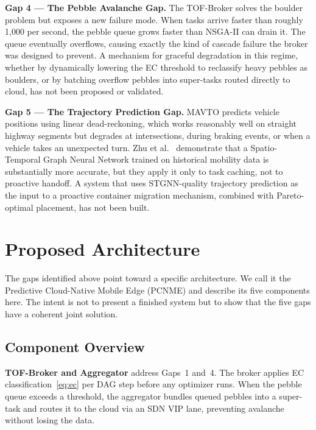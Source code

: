 \documentclass[12pt,a4paper]{article}
\begin{document}
\medskip\noindent\textbf{Gap 4 — The Pebble Avalanche Gap.}
The TOF-Broker solves the boulder problem but exposes a new failure mode. When
tasks arrive faster than roughly 1,000 per second, the pebble queue grows faster
than NSGA-II can drain it. The queue eventually overflows, causing exactly the
kind of cascade failure the broker was designed to prevent. A mechanism for
graceful degradation in this regime, whether by dynamically lowering the EC
threshold to reclassify heavy pebbles as boulders, or by batching overflow pebbles
into super-tasks routed directly to cloud, has not been proposed or validated.

\medskip\noindent\textbf{Gap 5 — The Trajectory Prediction Gap.}
MAVTO predicts vehicle positions using linear dead-reckoning, which works
reasonably well on straight highway segments but degrades at intersections, during
braking events, or when a vehicle takes an unexpected turn. Zhu et al.~\cite{zhu2025spatiotemporal}
demonstrate that a Spatio-Temporal Graph Neural Network trained on historical
mobility data is substantially more accurate, but they apply it only to task
caching, not to proactive handoff. A system that uses STGNN-quality trajectory
prediction as the input to a proactive container migration mechanism, combined with
Pareto-optimal placement, has not been built.

\section{Proposed Architecture}
\label{sec:proposed}

The gaps identified above point toward a specific architecture. We call it the
Predictive Cloud-Native Mobile Edge (PCNME) and describe its five components
here. The intent is not to present a finished system but to show that the five
gaps have a coherent joint solution.

\subsection{Component Overview}

\textbf{TOF-Broker and Aggregator} address Gaps~1 and~4. The broker applies
EC classification~\eqref{eq:ec} per DAG step before any optimizer runs. When
the pebble queue exceeds a threshold, the aggregator bundles queued pebbles into
a super-task and routes it to the cloud via an SDN VIP lane, preventing avalanche
without losing the data.
\end{document}
